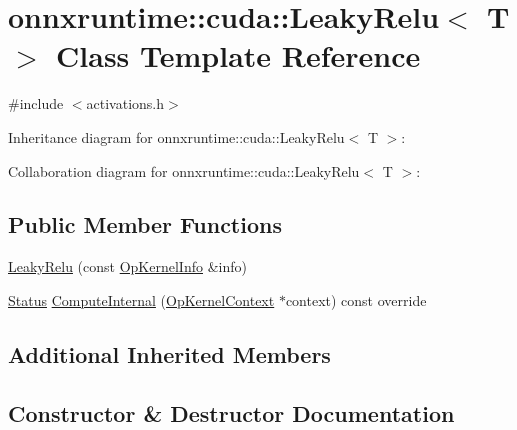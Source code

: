 \hypertarget{classonnxruntime_1_1cuda_1_1LeakyRelu}{}\section{onnxruntime\+:\+:cuda\+:\+:Leaky\+Relu$<$ T $>$ Class Template Reference}
\label{classonnxruntime_1_1cuda_1_1LeakyRelu}


{\ttfamily \#include $<$activations.\+h$>$}



Inheritance diagram for onnxruntime\+:\+:cuda\+:\+:Leaky\+Relu$<$ T $>$\+:


Collaboration diagram for onnxruntime\+:\+:cuda\+:\+:Leaky\+Relu$<$ T $>$\+:
\subsection*{Public Member Functions}
\begin{DoxyCompactItemize}
\item 
\mbox{\hyperlink{classonnxruntime_1_1cuda_1_1LeakyRelu_a769920ffed0c60e1f9a804a61998ab27}{Leaky\+Relu}} (const \mbox{\hyperlink{classonnxruntime_1_1OpKernelInfo}{Op\+Kernel\+Info}} \&info)
\item 
\mbox{\hyperlink{classonnxruntime_1_1common_1_1Status}{Status}} \mbox{\hyperlink{classonnxruntime_1_1cuda_1_1LeakyRelu_ab643554299b83ba95f722bd92193f2a4}{Compute\+Internal}} (\mbox{\hyperlink{classonnxruntime_1_1OpKernelContext}{Op\+Kernel\+Context}} $\ast$context) const override
\end{DoxyCompactItemize}
\subsection*{Additional Inherited Members}


\subsection{Constructor \& Destructor Documentation}
\mbox{\label{classonnxruntime_1_1cuda_1_1LeakyRelu_a769920ffed0c60e1f9a804a61998ab27}} 

